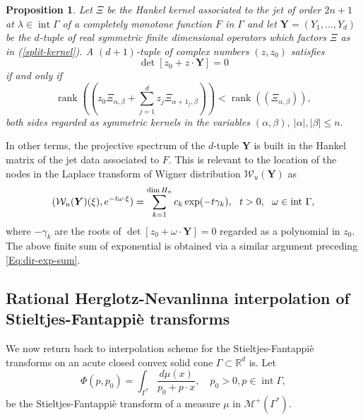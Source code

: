 \documentclass[11pt,reqno]{amsart}
\theoremstyle{plain}
\newtheorem{proposition}[theorem]{Proposition}
\theoremstyle{definition}
\numberwithin{equation}{section}
\begin{document}
\begin{proposition} Let $\Xi$ be the Hankel kernel associated to the jet of order $2n+1$ at $\lambda \in \operatorname{int} \Gamma$  of a completely monotone function $F$ in $\Gamma$ and let $\boldsymbol{Y} = (Y_1, \ldots, Y_d)$ be the $d$-tuple of real symmetric finite dimensional operators which factors  $\Xi$ as in (\ref{split-kernel}). A $(d+1)$-tuple of complex numbers $(z, z_0)$ satisfies
$$ \det [ z_0 + z\cdot \boldsymbol{Y}] = 0$$ 
if and only if 
$$ \operatorname{rank}  ((z_0 \Xi_{\alpha, \beta} + \sum_{j=1}^d z_j \Xi_{\alpha+1_j, \beta})) < \operatorname{rank}  (( \Xi_{\alpha, \beta})),$$
both sides regarded as symmetric kernels in the variables $(\alpha, \beta), \ |\alpha|, |\beta| \leq n.$
\end{proposition}

In other terms, the projective spectrum of the $d$-tuple $\boldsymbol{Y}$ is built in the Hankel matrix of the jet data associated to $F$. This is relevant to the location of the nodes in the Laplace transform of Wigner distribution ${\mathcal W}_u(\boldsymbol{Y})$ as
$$ ({\mathcal W}_u(\boldsymbol{Y})(\xi), e^{- t \omega \cdot \xi}) = \sum_{k=1}^{\dim H_n} c_k \exp (- t \gamma_k), \ \ t > 0, \ \ \omega \in {\rm int} \  \Gamma,$$
where $-\gamma_k$ are the roots of 
$ \det [z_0 + \omega \cdot \boldsymbol{Y}] = 0$ regarded as a polynomial in $z_0$. The above finite sum of exponential is obtained via a similar argument preceding \eqref{Eq:dir-exp-sum}.



	
	\subsection{Rational Herglotz-Nevanlinna interpolation of Stieltjes-Fantappi\`e transforms} \label{Subsec:Fantappie-interpolation}
	
	We now return back to interpolation scheme for the Stieltjes-Fantappi\`e transforms on an acute closed convex solid cone $\Gamma \subset \mathbb{R}^d$ is. Let 
	$$\Phi(p, p_0) = \int_{\Gamma^\ast} \frac{d\mu(x)}{p_0 + p\cdot x}, \quad p_0 >0, p \in \operatorname{int} \Gamma,$$ be the Stieltjes-Fantappi\`e transform of a measure $\mu$ in $\mathcal{M}^+(\Gamma^*)$. 
    
\end{document}
